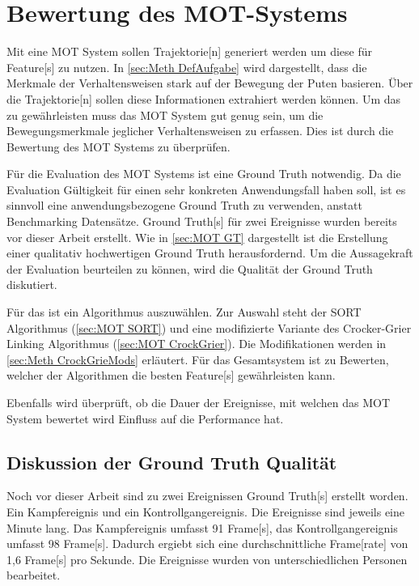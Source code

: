 \section{Bewertung des MOT-Systems}
Mit eine \gls{MOT} System sollen \gls{Trajektorie}[n] generiert werden um diese für \gls{Feature}[s] zu nutzen. In \ref{sec:Meth DefAufgabe} wird dargestellt, dass die Merkmale der Verhaltensweisen stark auf der Bewegung der Puten basieren. Über die \gls{Trajektorie}[n] sollen diese Informationen extrahiert werden können. Um das zu gewährleisten muss das \gls{MOT} System gut genug sein, um die Bewegungsmerkmale jeglicher Verhaltensweisen zu erfassen. Dies ist durch die Bewertung des \gls{MOT} Systems zu überprüfen. \par

Für die Evaluation des \gls{MOT} Systems ist eine \gls{Ground Truth} notwendig. Da die Evaluation Gültigkeit für einen sehr konkreten Anwendungsfall haben soll, ist es sinnvoll eine anwendungsbezogene \gls{Ground Truth} zu verwenden, anstatt Benchmarking Datensätze. \gls{Ground Truth}[s] für zwei Ereignisse wurden bereits vor dieser Arbeit erstellt. Wie in \ref{sec:MOT GT} dargestellt ist die Erstellung einer qualitativ hochwertigen \gls{Ground Truth} herausfordernd. Um die Aussagekraft der Evaluation beurteilen zu können, wird die Qualität der \gls{Ground Truth} diskutiert. \par

Für das  ist ein Algorithmus auszuwählen. Zur Auswahl steht der \acrshort{SORT} Algorithmus (\ref{sec:MOT SORT}) und eine modifizierte Variante des Crocker-Grier Linking Algorithmus (\ref{sec:MOT CrockGrier}). Die Modifikationen werden in \ref{sec:Meth CrockGrieMods} erläutert. Für das Gesamtsystem ist zu Bewerten, welcher der Algorithmen die besten \gls{Feature}[s] gewährleisten kann. \par

Ebenfalls wird überprüft, ob die Dauer der Ereignisse, mit welchen das \gls{MOT} System bewertet wird Einfluss auf die Performance hat.


\subsection{Diskussion der Ground Truth Qualität} \label{sec:Meth GT Quali}
Noch vor dieser Arbeit sind zu zwei Ereignissen \gls{Ground Truth}[s] erstellt worden. Ein Kampfereignis und ein Kontrollgangereignis. Die Ereignisse sind jeweils eine Minute lang. Das Kampfereignis umfasst 91 \gls{Frame}[s], das Kontrollgangereignis umfasst 98 \gls{Frame}[s]. Dadurch ergiebt sich eine durchschnittliche \gls{Frame}[rate] von 1,6 \gls{Frame}[s] pro Sekunde. Die Ereignisse wurden von unterschiedlichen Personen bearbeitet.  \par

